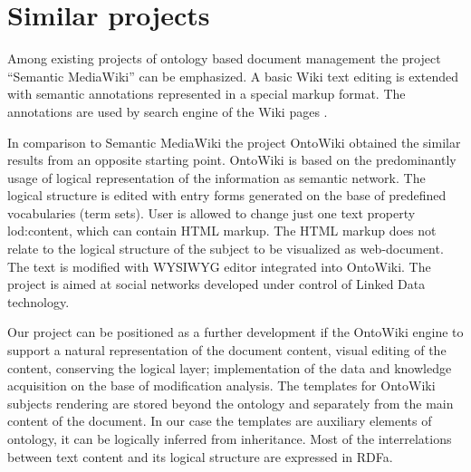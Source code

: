 \documentclass[conference]{IEEEtran}
\begin{document}
\section{Similar projects}
\label{sec:similar-projects}

Among existing projects of ontology based document management the project “Semantic MediaWiki” can be emphasized. A basic Wiki text editing is extended with semantic annotations represented in a special markup format. The annotations are used by search engine of the Wiki pages \cite{mediawiki}.

In comparison to Semantic MediaWiki the project OntoWiki \cite{heino} obtained the similar results from an opposite starting point. OntoWiki is based on the predominantly usage of logical representation of the information as semantic network. The logical structure is edited with entry forms generated on the base of predefined vocabularies (term sets). User is allowed to change just one text property lod:content, which can contain HTML markup. The HTML markup does not relate to the logical structure of the subject to be visualized as web-document. The text is modified with WYSIWYG editor integrated into OntoWiki. The project is aimed at social networks developed under control of Linked Data technology.

Our project can be positioned as a further development if the OntoWiki engine to support a natural representation of the document content, visual editing of the content, conserving the logical layer; implementation of the data and knowledge acquisition on the base of modification analysis. The templates for OntoWiki subjects rendering are stored beyond the ontology and separately from the main content of the document. In our case the templates are auxiliary elements of ontology, it can be logically inferred from inheritance. Most of the interrelations between text content and its logical structure are expressed in RDFa.
\end{document}
